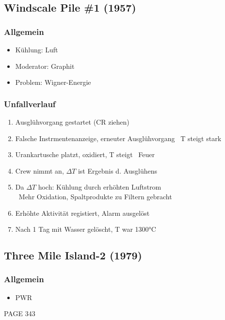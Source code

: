 \documentclass[12pt]{article}
\begin{document}
\subsection{Windscale Pile \#1 (1957)}

\subsubsection{Allgemein}
\begin{itemize}
  \item Kühlung: Luft
  \item Moderator: Graphit
  \item Problem: Wigner-Energie
\end{itemize}

\subsubsection{Unfallverlauf}
\begin{enumerate}
  \item Ausglühvorgang gestartet (CR ziehen)
  \item Falsche Instrmentenanzeige, erneuter Ausglühvorgang \textrightarrow\ T steigt stark
  \item Urankartusche platzt, oxidiert, T steigt \textrightarrow\ Feuer
  \item Crew nimmt an, \(\Delta T\) ist Ergebnis d. Ausglühens
  \item Da \(\Delta T\) hoch: Kühlung durch erhöhten Luftstrom\\
  \textrightarrow\ Mehr Oxidation, Spaltprodukte zu Filtern gebracht
  \item Erhöhte Aktivität registiert, Alarm ausgelöst
  \item Nach 1 Tag mit Wasser gelöscht, T war 1300°C
\end{enumerate}

\subsection{Three Mile Island-2 (1979)}

\subsubsection{Allgemein}
\begin{itemize}
  \item PWR
\end{itemize}

PAGE 343
\end{document}
